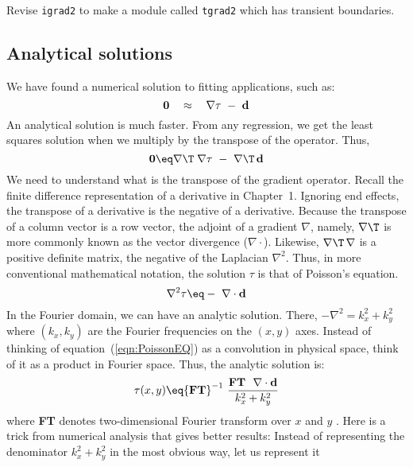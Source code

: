 Revise \texttt{igrad2} to make a module called {\tt tgrad2}
which has transient boundaries.


\subsection{Analytical solutions}
%
We have found a numerical solution to fitting applications, such as:
\begin{equation}
{\bf 0} \quad \approx \quad \nabla \tau \ - \ {\bf d}
\label{eqn:analyticsolution}
\end{equation}
An analytical solution is much faster.
From any regression, we get the least 
squares solution when we multiply by the transpose of the operator. Thus,
\begin{equation}
{\bf 0} \eq \nabla\T\;\nabla \tau \ -\ \nabla\T\,{\bf d}
\end{equation} 
We need to understand what is the transpose of the gradient operator.
Recall the finite difference representation of a derivative in Chapter~1.
Ignoring end effects,
the transpose of a derivative is the negative of a derivative.
Because the transpose of a column vector is a row vector,
the adjoint of a gradient $\nabla$, namely,
$\nabla\T$ is more commonly known as the vector divergence 
($\nabla \cdot$).
Likewise, $\nabla\T\,\nabla$ is a positive definite matrix,
the negative of the Laplacian $\nabla^2$.
Thus, in more conventional mathematical notation,
the solution $\tau$ is that of Poisson's equation. 
\begin{equation}
\nabla^2 \tau \eq - \ \nabla \cdot {\bf d} 
\label{eqn:PoissonEQ}
\end{equation} 
In the Fourier domain, we can have an analytic solution.
There, $-\nabla^2 = k_x^2 + k_y^2$ 
where $(k_x , k_y)$ are the Fourier frequencies on the $(x , y )$ axes.
Instead of thinking 
of equation~(\ref{eqn:PoissonEQ}) as a convolution in physical space,
think of it as a product in Fourier space.
Thus, the analytic solution is:
\begin{equation}
\tau(x,y) \eq
{\bf FT}^{-1}\ \frac{ {\bf FT} \ \ \nabla \cdot {\bf d} } { k_x^2+k_y^2}
\end{equation}
where {\bf FT} denotes two-dimensional Fourier transform over $x$ and $y$ . 
Here is a trick from numerical analysis that gives better results: Instead of 
representing the denominator $k_x^2+k_y^2$ in the most obvious way, let us represent it 
